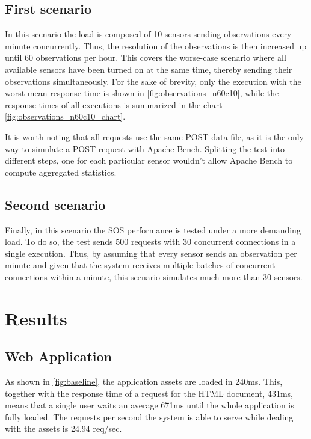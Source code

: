 \subsection*{First scenario}

In this scenario the load is composed of 10 sensors sending observations every minute concurrently. Thus, the resolution of the observations is then increased up until 60 observations per hour. This covers the worse-case scenario where all available sensors have been turned on at the same time, thereby sending their observations simultaneously. For the sake of brevity, only the execution with the worst mean response time is shown in \ref{fig:observations_n60c10}, while the response times of all executions is summarized in the chart \ref{fig:observations_n60c10_chart}.

It is worth noting that all requests use the same POST data file, as it is the only way to simulate a POST request with Apache Bench. Splitting the test into different steps, one for each particular sensor wouldn't allow Apache Bench to compute aggregated statistics.

\subsection*{Second scenario}

Finally, in this scenario the SOS performance is tested under a more demanding load. To do so, the test sends 500 requests with 30 concurrent connections in a single execution. Thus, by assuming that every sensor sends an observation per minute and given that the system receives multiple batches of concurrent connections within a minute, this scenario simulates much more than 30 sensors.

\section{Results}

\subsection*{Web Application}

As shown in \ref{fig:baseline}, the application assets are loaded in 240ms. This, together with the response time of a request for the HTML document, 431ms, means that a single user waits an average 671ms until the whole application is fully loaded. The requests per second the system is able to serve while dealing with the assets is 24.94 req/sec.

